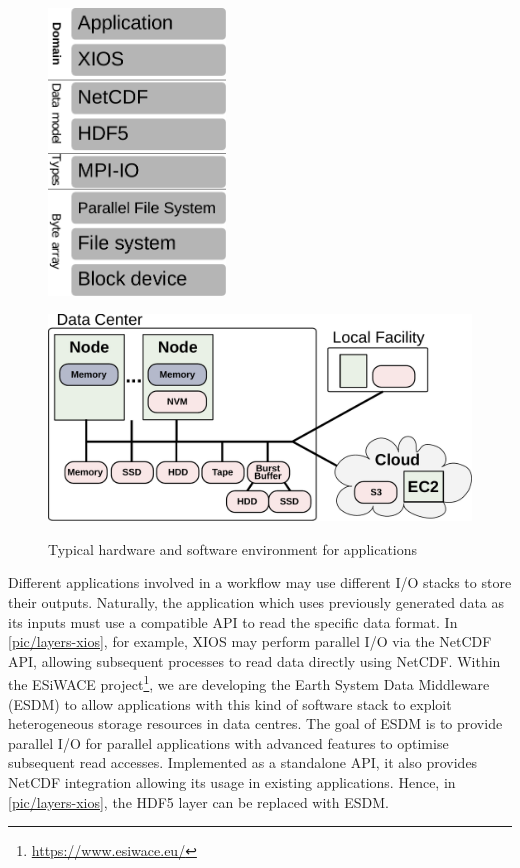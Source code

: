 \documentclass{superfri}
\begin{document}
\begin{figure}[b]
    \begin{minipage}{.42\linewidth}
        \centering
        \includegraphics[width=0.42\textwidth]{pic/layers-xios}
        \label{pic/layers-xios}
    \end{minipage}
    \begin{minipage}{.58\linewidth}
        \centering
        \includegraphics[width=1\textwidth]{pic/system}
        \label{pic/system}
    \end{minipage}
    \vspace{5pt}
    \caption{Typical hardware and software environment for applications}
    \label{fig:34}
\end{figure}

Different applications involved in a workflow may use different I/O stacks to store their outputs.
Naturally, the application which uses previously generated data as its inputs must use a compatible API to read the specific data format.
In \cref{pic/layers-xios}, for example, XIOS may perform parallel I/O via the NetCDF API, allowing subsequent processes to read data directly using NetCDF.
Within the ESiWACE project\footnote{\url{https://www.esiwace.eu/}}, we are developing the Earth System Data Middleware (ESDM)\cite{esdm} to allow applications with this kind of software stack to exploit heterogeneous storage resources in data centres.
The goal of ESDM is to provide parallel I/O for parallel applications with advanced features to optimise subsequent read accesses.
Implemented as a standalone API, it also provides NetCDF integration allowing its usage in existing applications.
Hence, in \cref{pic/layers-xios}, the HDF5 layer can be replaced with ESDM.
\end{document}
